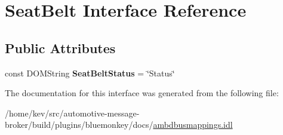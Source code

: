 \hypertarget{interfaceSeatBelt}{\section{Seat\+Belt Interface Reference}
\label{interfaceSeatBelt}
}
\subsection*{Public Attributes}
\begin{DoxyCompactItemize}
\item 
\hypertarget{interfaceSeatBelt_af060a6f2b6f0447a59dfb3505ecf4682}{const D\+O\+M\+String {\bfseries Seat\+Belt\+Status} = \char`\"{}Status\char`\"{}}\label{interfaceSeatBelt_af060a6f2b6f0447a59dfb3505ecf4682}

\end{DoxyCompactItemize}


The documentation for this interface was generated from the following file\+:\begin{DoxyCompactItemize}
\item 
/home/kev/src/automotive-\/message-\/broker/build/plugins/bluemonkey/docs/\hyperlink{ambdbusmappings_8idl}{ambdbusmappings.\+idl}\end{DoxyCompactItemize}
